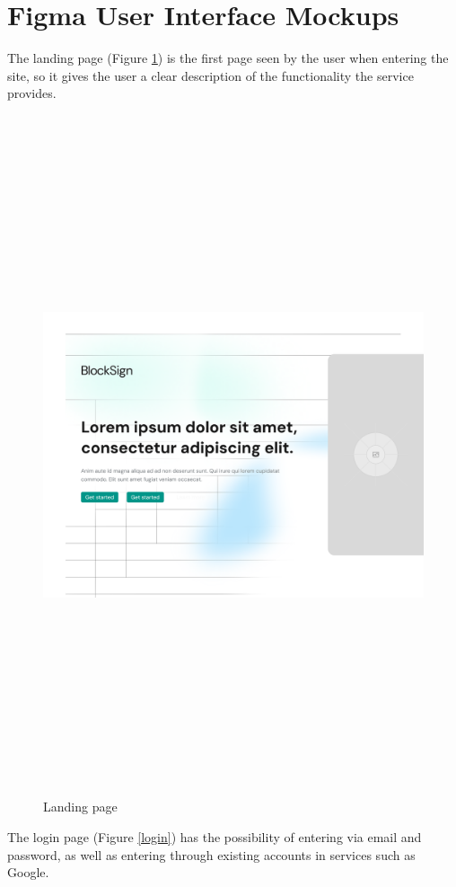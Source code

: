 \newpage
\section{Figma User Interface Mockups}

The landing page (Figure \ref{landing1}) is the first page seen by the user when entering the site, so it gives the user a clear description of the functionality the service provides.

\begin{figure}[H]
    \centering
    \includegraphics[width=18cm, height=20cm, keepaspectratio]{"images/figmaUI/landing-top.png"}
    \caption{Landing page}
    \label{landing1}
\end{figure}

\newpage
The login page (Figure \ref{login}) has the possibility of entering via email and password, as well as entering through existing accounts in services such as Google. 


